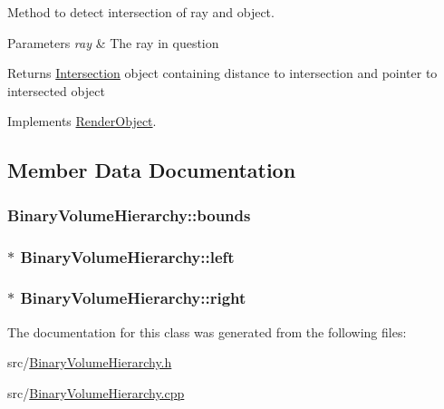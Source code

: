 Method to detect intersection of ray and object. 


\begin{DoxyParams}{Parameters}
{\em ray} & The ray in question \\
\hline
\end{DoxyParams}
\begin{DoxyReturn}{Returns}
\hyperlink{classIntersection}{Intersection} object containing distance to intersection and pointer to intersected object 
\end{DoxyReturn}


Implements \hyperlink{classRenderObject_a681f6674d94f16c4df69605d5e42d05c}{Render\+Object}.



\subsection{Member Data Documentation}
\subsubsection[{\texorpdfstring{bounds}{bounds}}]{ Binary\+Volume\+Hierarchy\+::bounds\hspace{0.3cm}{\ttfamily [private]}}\hypertarget{classBinaryVolumeHierarchy_a2722a35a0c3c6fee488f186c31869b53}{}\label{classBinaryVolumeHierarchy_a2722a35a0c3c6fee488f186c31869b53}
\subsubsection[{\texorpdfstring{left}{left}}]{$\ast$ Binary\+Volume\+Hierarchy\+::left\hspace{0.3cm}{\ttfamily [private]}}\hypertarget{classBinaryVolumeHierarchy_a76372fd6f7d6a5783d9b8688fc40d5b4}{}\label{classBinaryVolumeHierarchy_a76372fd6f7d6a5783d9b8688fc40d5b4}
\subsubsection[{\texorpdfstring{right}{right}}]{$\ast$ Binary\+Volume\+Hierarchy\+::right\hspace{0.3cm}{\ttfamily [private]}}\hypertarget{classBinaryVolumeHierarchy_a3b950d10a084fedfeaa02727d654b782}{}\label{classBinaryVolumeHierarchy_a3b950d10a084fedfeaa02727d654b782}


The documentation for this class was generated from the following files\+:\begin{DoxyCompactItemize}
\item 
src/\hyperlink{BinaryVolumeHierarchy_8h}{Binary\+Volume\+Hierarchy.\+h}\item 
src/\hyperlink{BinaryVolumeHierarchy_8cpp}{Binary\+Volume\+Hierarchy.\+cpp}\end{DoxyCompactItemize}
